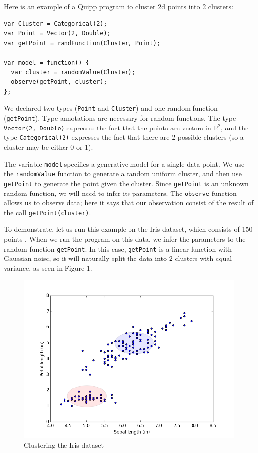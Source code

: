\documentclass{article}
\begin{document}
  Here is an example of a Quipp program to cluster 2d points into 2 clusters:

  {
  \begin{lstlisting}
var Cluster = Categorical(2);
var Point = Vector(2, Double);
var getPoint = randFunction(Cluster, Point);

var model = function() {
  var cluster = randomValue(Cluster);
  observe(getPoint, cluster);
};
  \end{lstlisting}
}

  We declared two types (\texttt{Point} and \texttt{Cluster}) and one
  random function (\texttt{getPoint}).  Type annotations are necessary for random
  functions.  The type \texttt{Vector(2, Double)} expresses the fact that the
  points are vectors in $\mathbb{R}^2$, and the type \texttt{Categorical(2)} expresses the
  fact that there are 2 possible clusters (so a cluster may be either 0 or 1).

  The variable \texttt{model} specifies a generative model for a single data point.
  We use the \texttt{randomValue} function to generate a random uniform cluster, and then
  use \texttt{getPoint} to generate the point given the cluster.  Since \texttt{getPoint}
  is an unknown random function, we will need to infer its parameters.
  The \texttt{observe} function allows us to observe data; here it says that our
  observation consist of the result of the call \texttt{getPoint(cluster)}.

  To demonstrate, let us run this example on the Iris dataset, which consists of 150 points \cite{Lichman:2013}.  When we run the program on this data, we infer the parameters to the random function \texttt{getPoint}.
  In this case, \texttt{getPoint} is a linear function with Gaussian noise, so it will naturally
  split the data into 2 clusters with equal variance, as seen in Figure 1.

  \begin{figure}[h]
  \begin{center}
    \includegraphics[scale=0.5]{../plots/irisclusters_orig.png}
  \end{center}
  \caption{Clustering the Iris dataset}
\end{figure}
\end{document}
